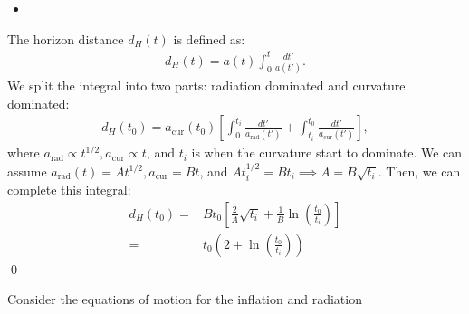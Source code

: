 \begin{itemize}
    \item [(e)]
\end{itemize}

The horizon distance $d_H(t)$ is defined as:
\begin{align}
d_H(t) = a(t) \int_0^t \frac{dt'}{a(t')}.
\end{align}
We split the integral into two parts: radiation dominated and curvature dominated:
\begin{align}
    d_H(t_0) = a_\text{cur}(t_0) \left[\int_0^{t_i}   \frac{dt'}{a_\text{rad}(t')}+ \int_{t_i}^{t_0}   \frac{dt'}{a_\text{cur}(t')} \right],
\end{align}
where $a_\text{rad}\propto t^{1/2}, a_\text{cur}\propto t$, and $t_i$ is when the curvature start to dominate. We can assume $a_\text{rad}(t)=At^{1/2},a_\text{cur}=Bt$, and $At_{i}^{1/2}=Bt_i\implies A=B\sqrt{t_i}$. Then, we can complete this integral: 
\begin{align}
    d_H(t_0)=& Bt_0 \left[  \frac{2}{A}\sqrt{t_i} + \frac{1}{B}\ln\left(\frac{t_0}{t_i}\right) \right]\\
    =& t_0\left(2+ \ln\left(\frac{t_0}{t_i}\right)  \right)
\end{align}
\qed





\clearpage
{}
Consider the equations of motion for the inflation and radiation

